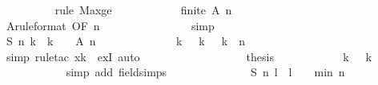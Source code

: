 \begin{isabellebody}
\ \ \ \ \ \ \ \ \isamarkupfalse%
\ {\isacharparenleft}rule\ Max{\isacharunderscore}ge{\isacharparenright}\isanewline
\ \ \ \ \ \ \ \ \ \ \isamarkupfalse%
\ {\isachardoublequoteopen}finite\ {\isacharparenleft}{\isacharquery}A\ {\isacharparenleft}n{\isacharminus}{}{\isacharparenright}{\isacharparenright}{\isachardoublequoteclose}\isanewline
\ \ \ \ \ \ \ \ \ \ \ \ \isamarkupfalse%
\ A{\isacharbrackleft}rule{\isacharunderscore}format{\isacharcomma}\ OF\ {\isacharbackquoteopen}n{\isacharminus}{}\ {\isasymge}\ {}{\isacharbackquoteclose}{\isacharbrackright}\isanewline
\ \ \ \ \ \ \ \ \ \ \ \ \isamarkupfalse%
\ simp\isanewline
\ \ \ \ \ \ \ \ \isamarkupfalse%
\isanewline
\ \ \ \ \ \ \ \ \ \ \isamarkupfalse%
\ {\isachardoublequoteopen}{\isacharquery}S\ {\isacharparenleft}n{\isacharminus}{}{\isacharparenright}\ {\isacharparenleft}k{\isacharminus}{}{\isacharparenright}\ {\isacharslash}\ {\isacharparenleft}k\ {\isacharminus}\ {}{\isacharparenright}\ {\isasymin}\ {\isacharquery}A\ {\isacharparenleft}n{\isacharminus}{}{\isacharparenright}{\isachardoublequoteclose}\isanewline
\ \ \ \ \ \ \ \ \ \ \ \ \isamarkupfalse%
\ {\isacharbackquoteopen}k\ {\isasymnoteq}\ {}{\isacharbackquoteclose}\ {\isacharbackquoteopen}k\ {\isasymge}\ {}{\isacharbackquoteclose}\ {\isacharbackquoteopen}k\ {\isasymle}\ n{\isacharbackquoteclose}\isanewline
\ \ \ \ \ \ \ \ \ \ \ \ \isamarkupfalse%
\ simp\ {\isacharparenleft}rule{\isacharunderscore}tac\ x{\isacharequal}{\isachardoublequoteopen}k{\isacharminus}{}{\isachardoublequoteclose}\ \ exI{\isacharcomma}\ auto{\isacharparenright}\isanewline
\ \ \ \ \ \ \ \ \isamarkupfalse%
\isanewline
\ \ \ \ \ \ \ \ \isamarkupfalse%
\ {\isacharquery}thesis\isanewline
\ \ \ \ \ \ \ \ \ \ \isamarkupfalse%
\ {\isacharbackquoteopen}k\ {\isasymge}\ {}{\isacharbackquoteclose}\ {\isacharbackquoteopen}k\ {\isasymnoteq}\ {}{\isacharbackquoteclose}\isanewline
\ \ \ \ \ \ \ \ \ \ \isamarkupfalse%
\ {\isacharparenleft}simp\ add{\isacharcolon}\ field{\isacharunderscore}simps{\isacharparenright}\isanewline
\ \ \ \ \ \ \isamarkupfalse%
\isanewline
\isanewline
\ \ \ \ \ \ \isamarkupfalse%
\ {\isachardoublequoteopen}{\isacharquery}S\ {\isacharparenleft}n{\isacharminus}{}{\isacharparenright}\ {\isacharparenleft}l{\isacharminus}{}{\isacharparenright}\ {\isasymge}\ {\isacharparenleft}l\ {\isacharminus}\ {}{\isacharparenright}\ {\isacharasterisk}\ {\isacharquery}min\ {\isacharparenleft}n\ {\isacharminus}\ {}{\isacharparenright}{\isachardoublequoteclose}\isanewline

\end{isabellebody}
